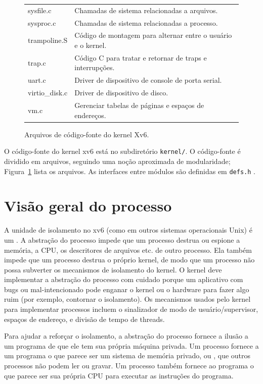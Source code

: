 \begin{figure}[t]
\begin{tabular}{l|l}
sysfile.c & Chamadas de sistema relacionadas a arquivos. \\
sysproc.c & Chamadas de sistema relacionadas a processo. \\
trampoline.S & Código de montagem para alternar entre o usuário e o kernel. \\
trap.c & Código C para tratar e retornar de traps e interrupções. \\
uart.c & Driver de dispositivo de console de porta serial. \\
virtio\_disk.c & Driver de dispositivo de disco. \\
vm.c & Gerenciar tabelas de páginas e espaços de endereços. \\
\end{tabular}
\caption{Arquivos de código-fonte do kernel Xv6.}
\label{fig:source}
\end{figure}

O código-fonte do kernel xv6 está no subdiretório {\tt kernel/}. O código-fonte
é dividido em arquivos, seguindo uma noção aproximada de modularidade;
Figura~\ref{fig:source} lista os arquivos. As interfaces entre módulos
são definidas em \lstinline{defs.h} .

\section{Visão geral do processo}

A unidade de isolamento no xv6 (como em outros sistemas operacionais Unix) é um 
.
A abstração do processo impede que um processo destrua ou espione a memória, a CPU, os descritores de arquivos etc. de outro processo.  Ela também impede que um processo
destrua o próprio kernel, de modo que um processo não possa subverter os mecanismos de isolamento do kernel.
O kernel deve implementar a abstração do processo com cuidado porque
um aplicativo com bugs ou mal-intencionado pode enganar o kernel ou o hardware para fazer
algo ruim (por exemplo, contornar o isolamento). Os mecanismos usados pelo
kernel para implementar processos incluem o sinalizador de modo de usuário/supervisor, espaços de endereço, e divisão de tempo de threads.

Para ajudar a reforçar o isolamento, a abstração do processo fornece a
ilusão a um programa de que ele tem sua própria máquina privada.  Um processo fornece
a um programa o que parece ser um sistema de memória privado, ou
, 
que outros processos não podem ler ou gravar.
Um processo também fornece ao programa o que parece ser sua própria CPU
para executar as instruções do programa.

